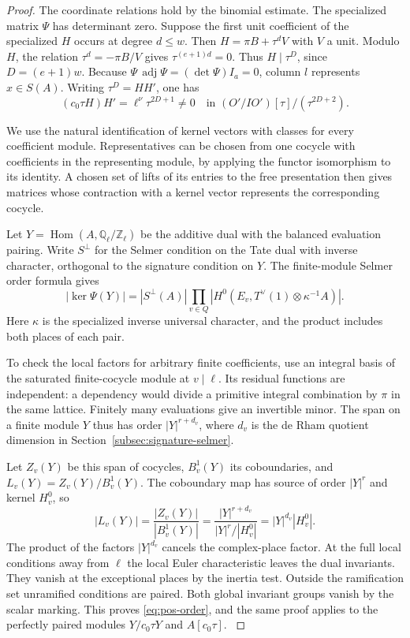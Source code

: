 \begin{proof}
The coordinate relations hold by the binomial estimate. The
specialized matrix \(\Psi\) has determinant zero. Suppose the
first unit coefficient of the specialized \(H\) occurs at
degree \(d\le w\). Then \(H=\pi B+\tau^d V\) with \(V\) a
unit. Modulo \(H\), the relation \(\tau^d=-\pi B/V\) gives
\(\tau^{(e+1)d}=0\). Thus \(H\mid\tau^D\), since \(D=(e+1)w\).
Because \(\Psi\,\operatorname{adj}\Psi=(\det\Psi)I_a=0\),
column \(l\) represents \(x\in S(A)\).
Writing \(\tau^D=H H'\), one has
\[
 (c_0\tau H)H'=\ell^\nu\tau^{2D+1}\ne0
 \quad\text{in }(O'/IO')[\tau]/(\tau^{2D+2}).
\]

We use the natural identification of kernel vectors with
classes for every coefficient module. Representatives can be
chosen from one cocycle with coefficients in the representing
module, by applying the functor isomorphism to its identity.
A chosen set of lifts of its entries to the free presentation
then gives matrices whose contraction with a kernel vector
represents the corresponding cocycle.

Let \(Y=\operatorname{Hom}(A,\mathbb Q_\ell/\mathbb Z_\ell)\)
be the additive dual with the balanced evaluation pairing.
Write \(S^\perp\) for the Selmer condition on the Tate dual
with inverse character, orthogonal to the signature condition
on \(Y\). The finite-module Selmer order formula gives
\begin{equation}\label{eq:pos-order}
 |\ker\Psi(Y)|=|S^\perp(A)|
             \prod_{v\in Q}|H^0(E_v,T^\vee(1)\otimes\kappa^{-1} A)|.
\end{equation}
Here \(\kappa\) is the specialized inverse universal
character, and the product includes both places of each pair.

To check the local factors for arbitrary finite coefficients,
use an integral basis of the saturated finite-cocycle module
at \(v\mid\ell\). Its residual functions are independent:
a dependency would divide a primitive integral combination
by \(\pi\) in the same lattice. Finitely many evaluations
give an invertible minor. The span on a finite module \(Y\)
thus has order \(|Y|^{r+d_v}\), where \(d_v\) is the de Rham
quotient dimension in Section~\ref{subsec:signature-selmer}.

Let \(Z_v(Y)\) be this span of cocycles, \(B^1_v(Y)\)
its coboundaries, and \(L_v(Y)=Z_v(Y)/B^1_v(Y)\).
The coboundary map has source of order \(|Y|^r\) and
kernel \(H^0_v\), so
\[
 |L_v(Y)|=\frac{|Z_v(Y)|}{|B^1_v(Y)|}
          =\frac{|Y|^{r+d_v}}{|Y|^r/|H^0_v|}
          =|Y|^{d_v}|H^0_v|.
\]
The product of the factors \(|Y|^{d_v}\) cancels the
complex-place factor.
At the full local conditions away from \(\ell\) the local
Euler characteristic leaves the dual invariants. They vanish
at the exceptional places by the inertia test. Outside the
ramification set unramified conditions are paired. Both global
invariant groups vanish by the scalar marking. This proves
\eqref{eq:pos-order}, and the same proof applies to the
perfectly paired modules \(Y/c_0\tau Y\) and \(A[c_0\tau]\).
\cite{milne-duality}


\end{proof}
